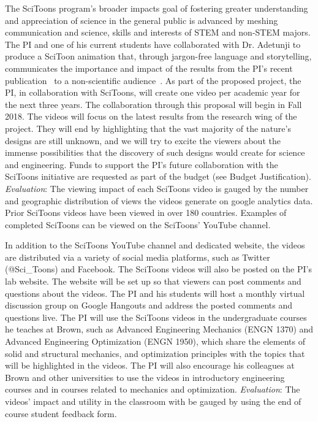 \documentclass[10pt,letterpaper]{article}
\begin{document}
    The SciToons program's broader impacts goal of fostering greater understanding and appreciation of science in the general public is advanced by meshing communication and science, skills and interests of STEM and non-STEM majors. The PI and one of his current students have collaborated with Dr. Adetunji to produce a SciToon animation that, through jargon-free language and storytelling, communicates the importance and impact of the results from the PI's recent publication~\cite{monn2015new} to a non-scientific audience~\cite{ScitoonsPNAS}. As part of the proposed project, the PI, in collaboration with SciToons, will create one video per academic year for the next three years. The collaboration through this proposal will begin in Fall 2018. The videos will focus on the latest results from the research wing of the project. They will end by highlighting that the vast majority of the nature's designs are still unknown, and we will try to excite the viewers about the immense possibilities that the discovery of such designs would create for science and engineering. Funds to support the PI's future collaboration with the SciToons initiative are requested as part of the budget (see Budget Justification). \emph{Evaluation}: The viewing impact of each SciToons video is gauged by the number and geographic distribution of views the videos generate on google analytics data. Prior SciToons videos have been viewed in over 180 countries. Examples of completed SciToons can be viewed on the SciToons' YouTube channel.

    In addition to the SciToons YouTube channel and dedicated website, the videos are distributed via a variety of social media platforms, such as Twitter (@Sci\_Toons) and Facebook. The SciToons videos will also be posted on the PI's lab website. The website will be set up so that viewers can post comments and questions about the videos. The PI and his students will host a monthly virtual discussion group on Google Hangouts and address the posted comments and questions live. The PI will use the SciToons videos in the undergraduate courses he teaches at Brown, such as Advanced Engineering Mechanics (ENGN 1370) and Advanced Engineering Optimization (ENGN 1950), which share the elements of solid and structural mechanics, and optimization principles with the topics that will be highlighted in the videos. The PI will also encourage his colleagues at Brown and other universities to use the videos in introductory engineering courses and in courses related to mechanics and optimization. \emph{Evaluation}: The videos' impact and utility in the classroom with be gauged by using the end of course student feedback form.
\end{document}
